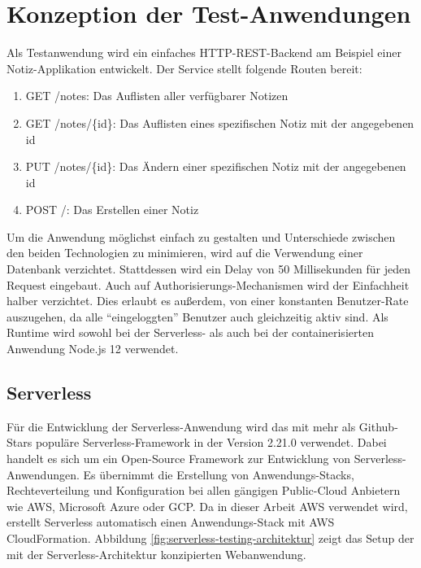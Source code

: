 \section{Konzeption der Test-Anwendungen}
Als Testanwendung wird ein einfaches HTTP-REST-Backend am Beispiel einer Notiz-Applikation entwickelt. Der Service stellt folgende Routen bereit:  

\begin{enumerate}
    \item GET /notes: Das Auflisten aller verfügbarer Notizen
    \item GET /notes/\{id\}: Das Auflisten eines spezifischen Notiz mit der angegebenen id
    \item PUT /notes/\{id\}: Das Ändern einer spezifischen Notiz mit der angegebenen id
    \item POST /: Das Erstellen einer Notiz
\end{enumerate}

Um die Anwendung möglichst einfach zu gestalten und Unterschiede zwischen den beiden Technologien zu minimieren, wird auf die Verwendung einer Datenbank verzichtet. Stattdessen wird ein Delay von 50 Millisekunden für jeden Request eingebaut. 
Auch auf Authorisierungs-Mechanismen wird der Einfachheit halber verzichtet. Dies erlaubt es außerdem, von einer konstanten Benutzer-Rate auszugehen, da alle "`eingeloggten"' Benutzer auch gleichzeitig aktiv sind\cite{molyneaux_art_2014}. 
Als Runtime wird sowohl bei der Serverless- als auch bei der containerisierten Anwendung Node.js 12 verwendet.

\subsection{Serverless}
Für die Entwicklung der Serverless-Anwendung wird das mit mehr als  Github-Stars populäre Serverless-Framework in der Version 2.21.0 verwendet\cite{noauthor_serverlessserverless_nodate}. Dabei handelt es sich um ein Open-Source Framework zur Entwicklung von Serverless-Anwendungen. Es übernimmt die Erstellung von Anwendungs-Stacks, Rechteverteilung und Konfiguration bei allen gängigen Public-Cloud Anbietern wie \ac{AWS}, Microsoft Azure oder \ac{GCP}. Da in dieser Arbeit \ac{AWS} verwendet wird, erstellt Serverless automatisch einen Anwendungs-Stack mit \ac{AWS} CloudFormation. 
Abbildung \ref{fig:serverless-testing-architektur} zeigt das Setup der mit der Serverless-Architektur konzipierten Webanwendung.

